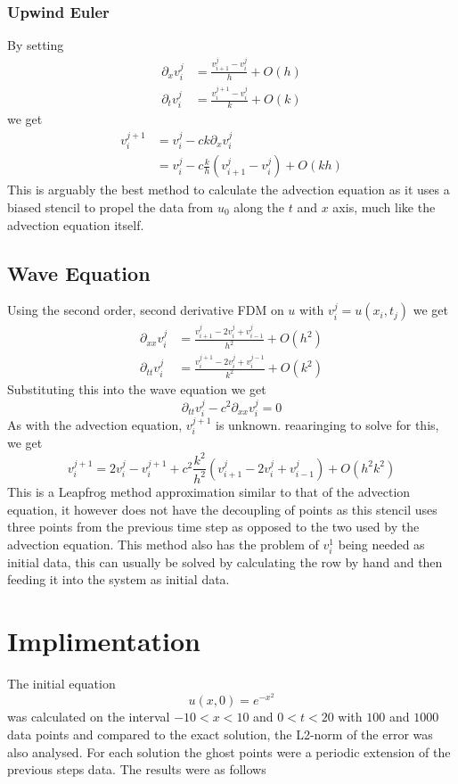 \subsubsection{Upwind Euler}
By setting
\begin{align*}
    \partial_xv_i^j &= \frac{v_{i+1}^j - v_i^j}{h} + O(h) \\
    \partial_tv_i^j &= \frac{v_i^{j+1} - v_i^j}{k} + O(k)
\end{align*}
we get
\begin{align*}
    v_i^{j+1} &= v_i^j - ck\partial_xv_i^j \\
	      &= v_i^j - c\frac{k}{h}(v_{i+1}^j - v_i^j) + O(kh)
\end{align*}
This is arguably the best method to calculate the advection equation as it uses a biased stencil to propel the data from $u_0$ along the $t$ and $x$ axis, much like the advection equation itself.
\subsection{Wave Equation}
Using the second order, second derivative FDM on $u$ with $v_i^j = u(x_i,t_j)$ we get
\begin{align*}
    \partial_{xx}v_i^j &= \frac{v_{i+1}^j - 2v_i^j + v_{i-1}^j}{h^2} + O(h^2) \\
    \partial_{tt}v_i^j &= \frac{v_i^{j+1} - 2v_i^j + v_i^{j-1}}{k^2} + O(k^2)
\end{align*}
Substituting this into the wave equation we get
\begin{equation}
  \partial_{tt}v_i^j - c^2\partial_{xx}v_i^j = 0
\end{equation}
As with the advection equation, $v_i^{j+1}$ is unknown. reaaringing to solve for this, we get
\begin{equation}
  v_i^{j+1} = 2v_i^j - v_i^{j+1} + c^2\frac{k^2}{h^2}(v_{i+1}^j - 2v_i^j + v_{i-1}^j) + O(h^2k^2)
\end{equation}
This is a Leapfrog method approximation similar to that of the advection equation, it however does not have the decoupling of points as this stencil uses three points from the previous time step as opposed to the two used by the advection equation. This method also has the problem of $v_i^1$ being needed as initial data, this can usually be solved by calculating the row by hand and then feeding it into the system as initial data.
\section{Implimentation}
The initial equation
\begin{equation}
  u(x,0) = e^{-x^2}
\end{equation}
was calculated on the interval $-10<x<10$ and $0<t<20$ with $100$ and $1000$ data points and compared to the exact solution, the L2-norm of the error was also analysed. For each solution the ghost points were a periodic extension of the previous steps data. The results were as follows
